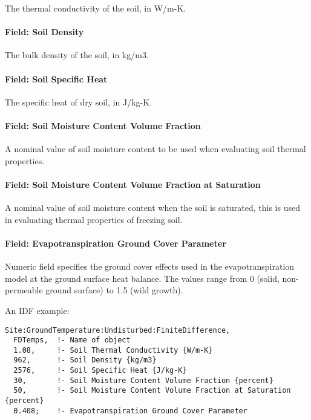 The thermal conductivity of the soil, in W/m-K.

\paragraph{Field: Soil Density}\label{field-soil-density-000}

The bulk density of the soil, in kg/m3.

\paragraph{Field: Soil Specific Heat}\label{field-soil-specific-heat-000}

The specific heat of dry soil, in J/kg-K.

\paragraph{Field: Soil Moisture Content Volume Fraction}\label{field-soil-moisture-content-volume-fraction}

A nominal value of soil moisture content to be used when evaluating soil thermal properties.

\paragraph{Field: Soil Moisture Content Volume Fraction at Saturation}\label{field-soil-moisture-content-volume-fraction-at-saturation}

A nominal value of soil moisture content when the soil is saturated, this is used in evaluating thermal properties of freezing soil.

\paragraph{Field: Evapotranspiration Ground Cover Parameter}\label{field-evapotranspiration-ground-cover-parameter}

Numeric field specifies the ground cover effects used in the evapotranspiration model at the ground surface heat balance. The values range from 0 (solid, non-permeable ground surface) to 1.5 (wild growth).

An IDF example:

\begin{lstlisting}
Site:GroundTemperature:Undisturbed:FiniteDifference,
  FDTemps,  !- Name of object
  1.08,     !- Soil Thermal Conductivity {W/m-K}
  962,      !- Soil Density {kg/m3}
  2576,     !- Soil Specific Heat {J/kg-K}
  30,       !- Soil Moisture Content Volume Fraction {percent}
  50,       !- Soil Moisture Content Volume Fraction at Saturation {percent}
  0.408;    !- Evapotranspiration Ground Cover Parameter
\end{lstlisting}

